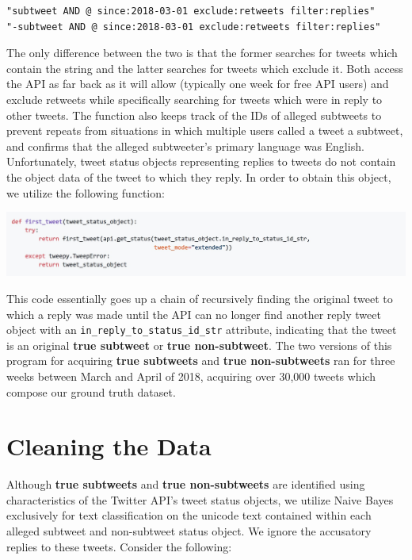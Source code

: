 \documentclass[11pt, twoside, reqno]{book}
\begin{document}
\begin{verbatim}
"subtweet AND @ since:2018-03-01 exclude:retweets filter:replies"
"-subtweet AND @ since:2018-03-01 exclude:retweets filter:replies"
\end{verbatim}

\noindent
The only difference between the two is that the former searches for tweets which contain the string and the latter searches for tweets which exclude it. Both access the API as far back as it will allow (typically one week for free API users) and exclude retweets while specifically searching for tweets which were in reply to other tweets. The function also keeps track of the IDs of alleged subtweets to prevent repeats from situations in which multiple users called a tweet a subtweet, and confirms that the alleged subtweeter's primary language was English. Unfortunately, tweet status objects representing replies to tweets do not contain the object data of the tweet to which they reply. In order to obtain this object, we utilize the following function:

\vskip 0.2in
\includegraphics[width=\textwidth]{first_tweet}

\noindent
This code essentially goes up a chain of recursively finding the original tweet to which a reply was made until the API can no longer find another reply tweet object with an \verb|in_reply_to_status_id_str| attribute, indicating that the tweet is an original \textbf{true subtweet} or \textbf{true non-subtweet}. The two versions of this program for acquiring \textbf{true subtweets} and \textbf{true non-subtweets} ran for three weeks between March and April of 2018, acquiring over 30,000 tweets which compose our ground truth dataset.

\section{Cleaning the Data}
\label{cleaning_data}

Although \textbf{true subtweets} and \textbf{true non-subtweets} are identified using characteristics of the Twitter API's tweet status objects, we utilize Naive Bayes exclusively for text classification on the unicode text contained within each alleged subtweet and non-subtweet status object. We ignore the accusatory replies to these tweets. Consider the following:
\end{document}
